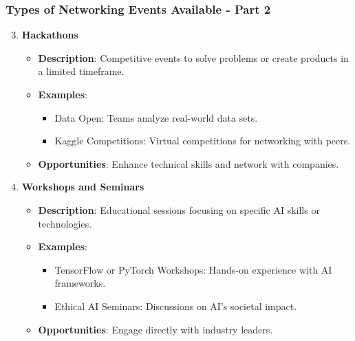 \documentclass{beamer}
\begin{document}
\begin{frame}[fragile]
    \frametitle{Types of Networking Events Available - Part 2}
    \begin{enumerate}
        \setcounter{enumi}{2} %
        \item \textbf{Hackathons}
            \begin{itemize}
                \item \textbf{Description}: Competitive events to solve problems or create products in a limited timeframe.
                \item \textbf{Examples}:
                    \begin{itemize}
                        \item Data Open: Teams analyze real-world data sets.
                        \item Kaggle Competitions: Virtual competitions for networking with peers.
                    \end{itemize}
                \item \textbf{Opportunities}: Enhance technical skills and network with companies.
            \end{itemize}

        \item \textbf{Workshops and Seminars}
            \begin{itemize}
                \item \textbf{Description}: Educational sessions focusing on specific AI skills or technologies.
                \item \textbf{Examples}:
                    \begin{itemize}
                        \item TensorFlow or PyTorch Workshops: Hands-on experience with AI frameworks.
                        \item Ethical AI Seminars: Discussions on AI's societal impact.
                    \end{itemize}
                \item \textbf{Opportunities}: Engage directly with industry leaders.
            \end{itemize}


\end{enumerate}
\end{frame}
\end{document}
